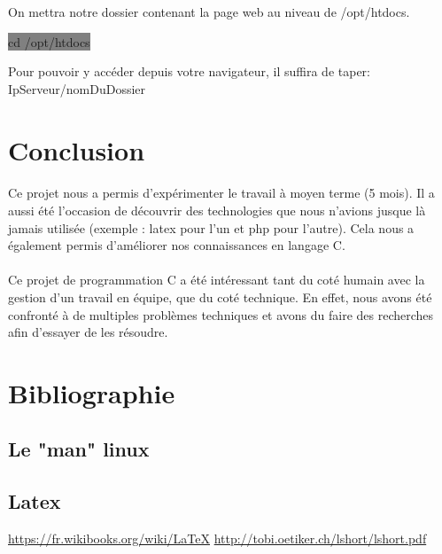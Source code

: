\documentclass[11pt,a4paper,titlepage, oneside]{article}
\begin{document}
    	    On mettra notre dossier contenant la page web au niveau de /opt/htdocs.
    	    
    	    \colorbox{gray}{cd /opt/htdocs}
	
	Pour pouvoir y accéder depuis votre navigateur, il suffira de taper: IpServeur/nomDuDossier
	

\newpage
\section{{\color{red}Conclusion}}
	\paragraph{}	
		Ce projet nous a permis d'expérimenter le travail à moyen terme (5 mois). Il a aussi été l'occasion de découvrir des technologies que nous n'avions jusque là jamais utilisée (exemple : latex pour l'un et php pour l'autre). Cela nous a également permis d’améliorer nos connaissances en langage C. 
	\paragraph{}
		Ce projet de programmation C a été intéressant tant du coté humain avec la gestion d’un travail en équipe, que du coté technique.
		En effet, nous avons été confronté à de multiples problèmes techniques et avons du faire des recherches afin d'essayer de les résoudre.


\newpage
\section{{\color{red}Bibliographie}}
		
	\subsection*{\color{blue}Le "man" linux}
	
	\subsection{\color{blue}Latex}
		\url{https://fr.wikibooks.org/wiki/LaTeX}
		\url{http://tobi.oetiker.ch/lshort/lshort.pdf}
	
	
\end{document}
